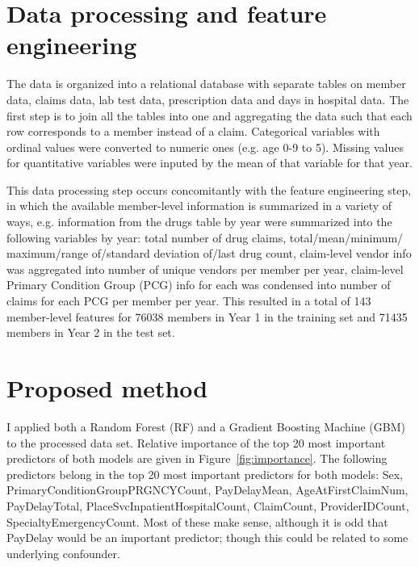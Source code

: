 \documentclass[8pt]{article}
\begin{document}
\section{Data processing and feature engineering} 
\label{sec:data-processing}
The data is organized into a relational database with separate tables on member data, claims data, lab test data, prescription data and days in hospital data. The first step is to join all the tables into one and aggregating the data such that each row corresponds to a member instead of a claim. Categorical variables with ordinal values were converted to numeric ones (e.g. age 0-9 to 5). Missing values for quantitative variables were inputed by the mean of that variable for that year.

This data processing step occurs concomitantly with the feature engineering step, in which the available member-level information is summarized in a variety of ways, e.g. information from the drugs table by year were summarized into the following variables by year: total number of drug claims, total/mean/minimum/ maximum/range of/standard deviation of/last drug count, claim-level vendor info was aggregated into number of unique vendors per member per year, claim-level Primary Condition Group (PCG) info for each was condensed into number of claims for each PCG per member per year. This resulted in a total of 143 member-level features for 76038 members in Year 1 in the training set and 71435 members in Year 2 in the test set.
\section{Proposed method}
I applied both a Random Forest (RF) and a Gradient Boosting Machine (GBM) to the processed data set. Relative importance of the top 20 most important predictors of both models are given in Figure~\ref{fig:importance}. The following predictors belong in the top 20 most important predictors for both models: Sex, PrimaryConditionGroupPRGNCYCount, PayDelayMean, AgeAtFirstClaimNum, PayDelayTotal, PlaceSvcInpatientHospitalCount, ClaimCount, ProviderIDCount, SpecialtyEmergencyCount. Most of these make sense, although it is odd that PayDelay would be an important predictor; though this could be related to some underlying confounder.
\end{document}
